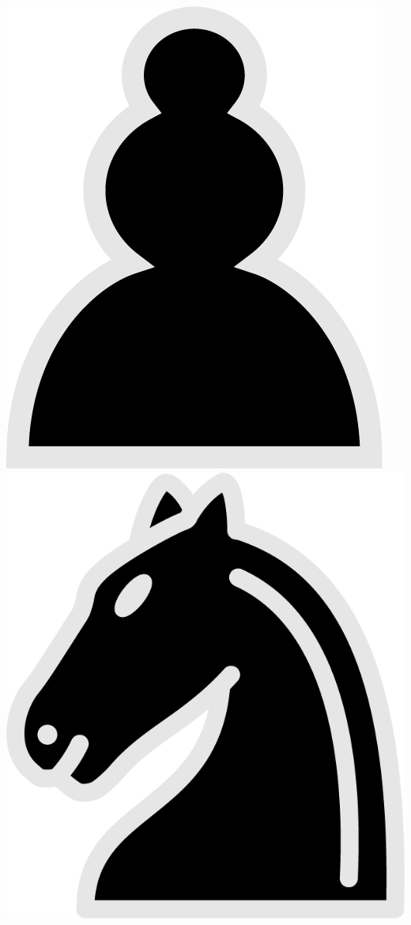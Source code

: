 \documentclass{article}
\begin{document}
\begin{center}
	\includegraphics[scale=0.07]{image2}  
	\includegraphics[scale=0.07]{image13}   

\end{center}
\end{document}
